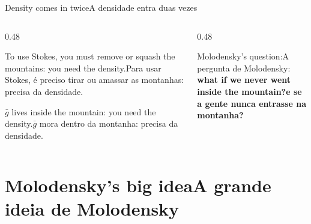\documentclass[aspectratio=169,11pt]{beamer}
\newcommand{\tr}[2]{\ifEN#2\else#1\fi}
\newcommand{\bnum}[1]{\textbf{\textcolor{mTeal}{#1}}}
\begin{document}
\begin{frame}{\tr{A densidade entra duas vezes}{Density comes in twice}}
  \begin{columns}[T]
    \begin{column}{0.48\textwidth}
      \begin{armadilha}[title={\tr{1 · No geoide}{1 · In the geoid}}]
        \tr{Para usar Stokes, é preciso tirar ou amassar as montanhas: \alert{precisa da
        densidade}.}{To use Stokes, you must remove or squash the mountains: \alert{you need
        the density}.}
      \end{armadilha}
      \medskip
      \begin{armadilha}[title={\tr{2 · Na altitude ortométrica}{2 · In the orthometric height}}]
        \tr{$\bar g$ mora dentro da montanha: \alert{precisa da densidade}.}{$\bar g$ lives
        inside the mountain: \alert{you need the density}.}
      \end{armadilha}
    \end{column}
    \begin{column}{0.48\textwidth}
      \centering
      \bigskip

      \tr{A pergunta de Molodensky:}{Molodensky's question:}\\[2pt]
      \bnum{\tr{e se a gente nunca entrasse na montanha?}{what if we never went inside the
      mountain?}}
    \end{column}
  \end{columns}
\end{frame}

\section{\tr{A grande ideia de Molodensky}{Molodensky's big idea}}
\end{document}
